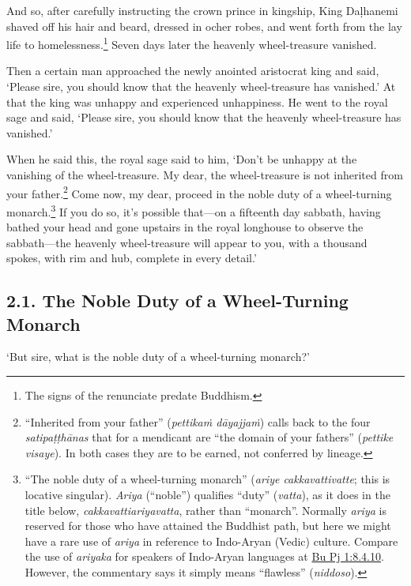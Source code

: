 \documentclass[12pt,openany]{book}%
\begin{document}
And so, after carefully instructing the crown prince in kingship, King \textsanskrit{Daḷhanemi} shaved off his hair and beard, dressed in ocher robes, and went forth from the lay life to homelessness.\footnote{The signs of the renunciate predate Buddhism. } Seven days later the heavenly wheel-treasure vanished. 

Then a certain man approached the newly anointed aristocrat king and said, ‘Please sire, you should know that the heavenly wheel-treasure has vanished.’ At that the king was unhappy and experienced unhappiness. He went to the royal sage and said, ‘Please sire, you should know that the heavenly wheel-treasure has vanished.’ 

When he said this, the royal sage said to him, ‘Don’t be unhappy at the vanishing of the wheel-treasure. My dear, the wheel-treasure is not inherited from your father.\footnote{“Inherited from your father” (\textit{\textsanskrit{pettikaṁ} \textsanskrit{dāyajjaṁ}}) calls back to the four \textit{\textsanskrit{satipaṭṭhānas}} that for a mendicant are “the domain of your fathers” (\textit{pettike visaye}). In both cases they are to be earned, not conferred by lineage. } Come now, my dear, proceed in the noble duty of a wheel-turning monarch.\footnote{“The noble duty of a wheel-turning monarch” (\textit{ariye cakkavattivatte}; this is locative singular). \textit{Ariya} (“noble”) qualifies “duty” (\textit{vatta}), as it does in the title below, \textit{cakkavattiariyavatta}, rather than “monarch”. Normally \textit{ariya} is reserved for those who have attained the Buddhist path, but here we might have a rare use of \textit{ariya} in reference to Indo-Aryan (Vedic) culture. Compare the use of \textit{ariyaka} for speakers of Indo-Aryan languages at \href{https://suttacentral.net/pli-tv-bu-vb-pj1/en/sujato\#8.4.10}{Bu Pj 1:8.4.10}. However, the commentary says it simply means “flawless” (\textit{niddoso}). } If you do so, it’s possible that—on a fifteenth day sabbath, having bathed your head and gone upstairs in the royal longhouse to observe the sabbath—the heavenly wheel-treasure will appear to you, with a thousand spokes, with rim and hub, complete in every detail.’ 

\subsection*{2.1. The Noble Duty of a Wheel-Turning Monarch }

‘But sire, what is the noble duty of a wheel-turning monarch?’ 
\end{document}
